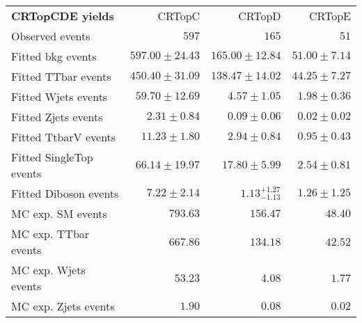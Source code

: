 

\begin{table}
\begin{center}
\setlength{\tabcolsep}{0.0pc}
{\small
\begin{tabular*}{\textwidth}{@{\extracolsep{\fill}}lrrr}
\noalign{\smallskip}\hline\noalign{\smallskip}
{\bf CRTopCDE yields}           & CRTopC            & CRTopD            & CRTopE              \\[-0.05cm]
\noalign{\smallskip}\hline\noalign{\smallskip}
Observed events          & $597$              & $165$              & $51$                    \\
\noalign{\smallskip}\hline\noalign{\smallskip}
Fitted bkg events         & $597.00 \pm 24.43$          & $165.00 \pm 12.84$          & $51.00 \pm 7.14$              \\
\noalign{\smallskip}\hline\noalign{\smallskip}
        Fitted TTbar events         & $450.40 \pm 31.09$          & $138.47 \pm 14.02$          & $44.25 \pm 7.27$              \\
        Fitted Wjets events         & $59.70 \pm 12.69$          & $4.57 \pm 1.05$          & $1.98 \pm 0.36$              \\
        Fitted Zjets events         & $2.31 \pm 0.84$          & $0.09 \pm 0.06$          & $0.02 \pm 0.02$              \\
        Fitted TtbarV events         & $11.23 \pm 1.80$          & $2.94 \pm 0.84$          & $0.95 \pm 0.43$              \\
        Fitted SingleTop events         & $66.14 \pm 19.97$          & $17.80 \pm 5.99$          & $2.54 \pm 0.81$              \\
        Fitted Diboson events         & $7.22 \pm 2.14$          & $1.13_{-1.13}^{+1.27}$          & $1.26 \pm 1.25$              \\
 \noalign{\smallskip}\hline\noalign{\smallskip}
MC exp. SM events              & $793.63$          & $156.47$          & $48.40$              \\
\noalign{\smallskip}\hline\noalign{\smallskip}
        MC exp. TTbar events         & $667.86$          & $134.18$          & $42.52$              \\
        MC exp. Wjets events         & $53.23$          & $4.08$          & $1.77$              \\
        MC exp. Zjets events         & $1.90$          & $0.08$          & $0.02$              \\

\end{tabular*}}
\end{center}
\end{table}
